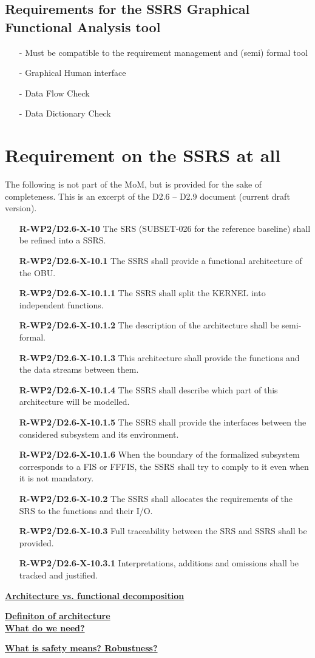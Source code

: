 \documentclass{template/openetcs_article}
\begin{document}
\subsection{Requirements for the SSRS Graphical Functional Analysis tool}
\begin{itemize}
  \item[-]Must be compatible to the requirement management and (semi) formal tool
  \item[-]Graphical Human interface
  \item[-]Data Flow Check
  \item[-]Data Dictionary Check
\end{itemize}

\section{Requirement on the SSRS at all}
The following is not part of the MoM, but is provided for the sake of completeness. This is an excerpt of the D2.6 – D2.9 document (current draft version).

\begin{itemize}
\item[\textbf{R-WP2/D2.6-X-10}] The SRS (SUBSET-026 for the reference baseline) shall be refined into a SSRS.
\item[\textbf{R-WP2/D2.6-X-10.1}] The SSRS shall provide a functional architecture of the OBU.
\item[\textbf{R-WP2/D2.6-X-10.1.1}] The SSRS shall split the KERNEL into independent functions.
\item[\textbf{R-WP2/D2.6-X-10.1.2}] The description of the architecture shall be semi-formal.
\item[\textbf{R-WP2/D2.6-X-10.1.3}] This architecture shall provide the functions and the data streams between them.
\item[\textbf{R-WP2/D2.6-X-10.1.4}] The SSRS shall describe which part of this architecture will be modelled.
\item[\textbf{R-WP2/D2.6-X-10.1.5}] The SSRS shall provide the interfaces between the considered subsystem and its environment.
\item[\textbf{R-WP2/D2.6-X-10.1.6}] When the boundary of the formalized subsystem corresponds to a FIS or FFFIS, the SSRS shall try to comply to it even when it is not mandatory.
\item[\textbf{R-WP2/D2.6-X-10.2}] The SSRS shall allocates the requirements of the SRS to the functions and their I/O.
\item[\textbf{R-WP2/D2.6-X-10.3}] Full traceability between the SRS and SSRS shall be provided.
\item[\textbf{R-WP2/D2.6-X-10.3.1}] Interpretations, additions and omissions shall be tracked and justified.
\end{itemize}
\textbf{
\underline{Architecture vs. functional decomposition}}


\textbf{\underline{Definiton of architecture}}\\
\textbf{\underline{What do we need?}}


\textbf{\underline{What is safety means? Robustness?}}

\end{document}
